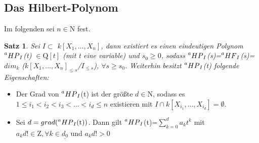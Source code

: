 \documentclass{article}
\newtheorem{satz}{Satz}
\newcommand*{\R}{k[X_{1},\ldots,X_{n}]}
\newcommand*{\indx}[2]{{#1}_{#2}}
\newcommand*{\hf}[1]{$\prescript{a}{}{HF}_{#1}$}
\newcommand*{\hp}[1]{$\prescript{a}{}{HP}_{#1}$}
\newcommand*{\kette}[2]{$1\leq {#1}_1<{#1}_2<{#1}_3<...<{#1}_{#2}\leq n$}
\newcommand*{\ideal}{$I$}
\begin{document}
\subsection{Das Hilbert-Polynom}

Im folgenden sei $n \in \mathrm{N}$ fest.

\begin{satz}
	Sei  \ideal $\subset$ $\R$, dann existiert es einen eindeutigen Polynom \hp{I}(t) $\in \mathrm{Q}[t]$ (mit t eine variable) und $\indx{s}{0}\geq0$,  sodass \hp{I}(s)=\hf{I}(s)= $\indx{dim}{k}$ ($\indx{\R}{\leq s}$/$\indx{I}{\leq s}$), $\forall s\geq\indx{s}{0}$. Weiterhin besitzt \hp{I}(t) folgende Eigenschaften:	
\end{satz}
\begin{itemize}
	\item Der Grad von \hp{I}(t) ist der größte $d \in \mathrm{N}$, sodass es \kette{i}{d} existieren mit $I\cap k[X_{{i}_{1}},\ldots,X_{{i}_{d}}]={\emptyset}$.
	\item Sei $d=grad(\textnormal{\hp{I}(t)})$. Dann gilt \hp{I}(t)=$\sum_{k=0}^{d} \indx{a}{k}t^k$ mit $\indx{a}{k}d! \in \mathrm{Z}, \forall k\in \underline{\indx{d}{0}}$ und $\indx{a}{k}d!>0$
\end{itemize}
\end{document}
